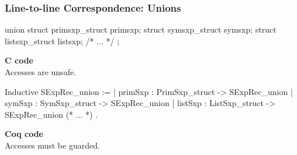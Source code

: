 \documentclass{beamer}
\begin{document}
\begin{frame}[fragile]
    \frametitle{Line-to-line Correspondence: Unions}

    \begin{changemargin}{-5mm}{-5mm}
\begin{minipage}{.8\textwidth}
\begin{ccode}
union {
    struct primsxp_struct primsxp;
    struct symsxp_struct symsxp;
    struct listsxp_struct listsxp;
    /* ... */
};
\end{ccode}
\end{minipage}
    \begin{minipage}{.18\textwidth}
    \textbf{C code}\\

    Accesses are unsafe.
    \end{minipage}

\begin{minipage}{.8\textwidth}
\begin{coqcode}
Inductive SExpRec_union :=
  | primSxp : PrimSxp_struct -> SExpRec_union
  | symSxp : SymSxp_struct -> SExpRec_union
  | listSxp : ListSxp_struct -> SExpRec_union
  (* ... *)
  .
\end{coqcode}
\end{minipage}
    \begin{minipage}{.18\textwidth}
    \textbf{Coq code}\\

    Accesses must be guarded.
    \end{minipage}
\end{changemargin}


\end{frame}
\end{document}

